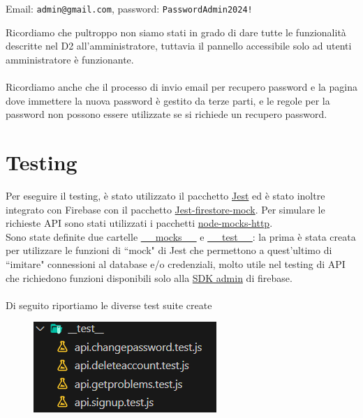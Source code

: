 \documentclass[11pt, a4paper]{article}
\theoremstyle{definition}
\begin{document}
\begin{center}
  Email: \texttt{admin@gmail.com}, password: \texttt{PasswordAdmin2024!}
\end{center}

\noindent Ricordiamo che pultroppo non siamo stati in grado di dare tutte le funzionalità descritte nel D2 all'amministratore, tuttavia il pannello accessibile solo ad utenti amministratore è funzionante.\\\\
Ricordiamo anche che il processo di invio email per recupero password e la pagina dove immettere la nuova password è gestito da terze parti, e le regole per la password non possono essere utilizzate se si richiede un recupero password.




\newpage
\section{Testing}
Per eseguire il testing, è stato utilizzato il pacchetto \href{https://jestjs.io/}{Jest} ed è stato inoltre integrato con Firebase con il pacchetto \href{https://www.npmjs.com/package/firestore-jest-mock}{Jest-firestore-mock}. Per simulare le richieste API sono stati
utilizzati i pacchetti \href{https://www.npmjs.com/package/node-mocks-http}{node-mocks-http}.\\
Sono state definite due cartelle \href{https://github.com/G17-UniTn/CodeBase/tree/master/__mocks__}{\_\_mocks\_\_} e \href{https://github.com/G17-UniTn/CodeBase/tree/master/__test__}{\_\_test\_\_}: la prima è stata creata per utilizzare le funzioni di ``mock" di Jest 
che permettono a quest'ultimo di ``imitare" connessioni al database e/o credenziali, molto utile nel testing di API che richiedono funzioni disponibili solo alla \href{https://firebase.google.com/docs/reference/admin}{SDK admin} di firebase.
\\\\
Di seguito riportiamo le diverse test suite create

\begin{figure}[H]
  \centering
  \includegraphics[scale = 1]{materiale/testing/test-overview.png}
\end{figure}
\end{document}
